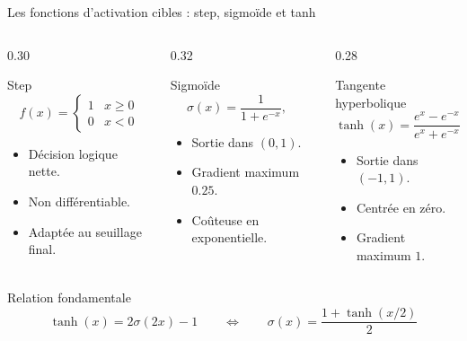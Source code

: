 \documentclass[10pt,aspectratio=169]{beamer}
\begin{document}
\begin{frame}{Les fonctions d'activation cibles : step, sigmoïde et tanh}
\begin{columns}[T]
\begin{column}{0.30\textwidth}
  \begin{block}{Step}
    \[
      f(x)=\begin{cases}1 & x\ge 0\\0 & x<0\end{cases}
    \]
    \small
    \begin{itemize}
      \item Décision logique nette.
      \item Non différentiable.
      \item Adaptée au seuillage final.
    \end{itemize}
  \end{block}
\end{column}
\begin{column}{0.32\textwidth}
  \begin{block}{Sigmoïde}
    \[
      \sigma(x)=\frac{1}{1+e^{-x}},\quad 
    \]
    \small
    \begin{itemize}
      \item Sortie dans \((0,1)\).
      \item Gradient maximum \(0.25\).
      \item Coûteuse en exponentielle.
    \end{itemize}
  \end{block}
\end{column}
\begin{column}{0.28\textwidth}
  \begin{block}{Tangente hyperbolique}
    \[
      \tanh(x)=\frac{e^x-e^{-x}}{e^x+e^{-x}},\quad 
    \]
    \small
    \begin{itemize}
      \item Sortie dans \((-1,1)\).
      \item Centrée en zéro.
      \item Gradient maximum \(1\).
    \end{itemize}
  \end{block}
\end{column}
\end{columns}
\vspace{0.18cm}
\begin{exampleblock}{Relation fondamentale}
\[
  \tanh(x)=2\sigma(2x)-1
  \qquad \Longleftrightarrow \qquad
  \sigma(x)=\frac{1+\tanh(x/2)}{2}
\]
\end{exampleblock}
\end{frame}
\end{document}
